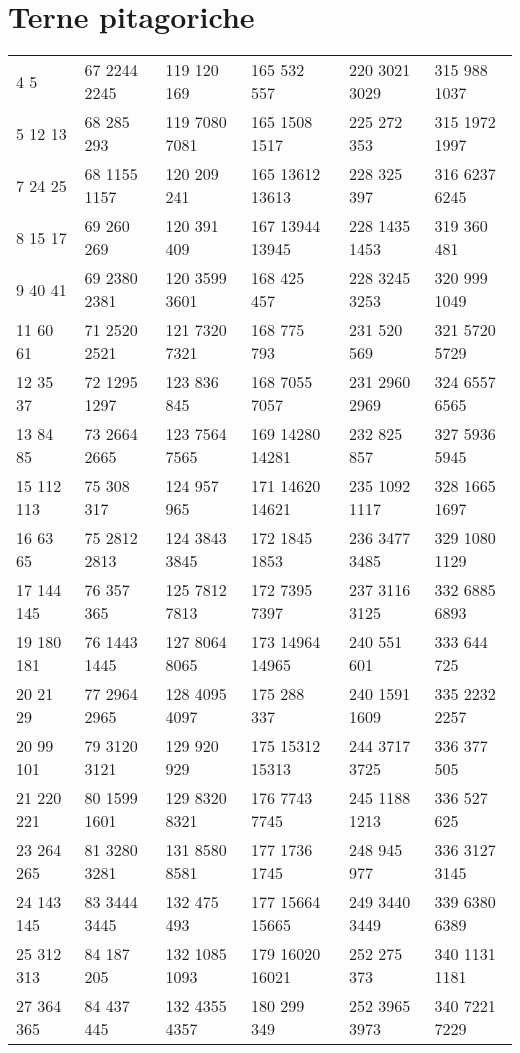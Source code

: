 
\section{Terne pitagoriche}
\begin{center}
\footnotesize
\begin{longtable}[c]{llllll}
	\toprule\endhead
\bottomrule \endfoot
3 4 5&67 2244 2245&119 120 169&165 532 557&220 3021 3029&315 988 1037\\
5 12 13&68 285 293&119 7080 7081&165 1508 1517&225 272 353&315 1972 1997\\
7 24 25&68 1155 1157&120 209 241&165 13612 13613&228 325 397&316 6237 6245\\
8 15 17&69 260 269&120 391 409&167 13944 13945&228 1435 1453&319 360 481\\
9 40 41&69 2380 2381&120 3599 3601&168 425 457&228 3245 3253&320 999 1049\\
11 60 61&71 2520 2521&121 7320 7321&168 775 793&231 520 569&321 5720 5729\\
12 35 37&72 1295 1297&123 836 845&168 7055 7057&231 2960 2969&324 6557 6565\\
13 84 85&73 2664 2665&123 7564 7565&169 14280 14281&232 825 857&327 5936 5945\\
15 112 113&75 308 317&124 957 965&171 14620 14621&235 1092 1117&328 1665 1697\\
16 63 65&75 2812 2813&124 3843 3845&172 1845 1853&236 3477 3485&329 1080 1129\\
17 144 145&76 357 365&125 7812 7813&172 7395 7397&237 3116 3125&332 6885 6893\\
19 180 181&76 1443 1445&127 8064 8065&173 14964 14965&240 551 601&333 644 725\\
20 21 29&77 2964 2965&128 4095 4097&175 288 337&240 1591 1609&335 2232 2257\\
20 99 101&79 3120 3121&129 920 929&175 15312 15313&244 3717 3725&336 377 505\\
21 220 221&80 1599 1601&129 8320 8321&176 7743 7745&245 1188 1213&336 527 625\\
23 264 265&81 3280 3281&131 8580 8581&177 1736 1745&248 945 977&336 3127 3145\\
24 143 145&83 3444 3445&132 475 493&177 15664 15665&249 3440 3449&339 6380 6389\\
25 312 313&84 187 205&132 1085 1093&179 16020 16021&252 275 373&340 1131 1181\\
27 364 365&84 437 445&132 4355 4357&180 299 349&252 3965 3973&340 7221 7229\\

\end{longtable}
\end{center}
